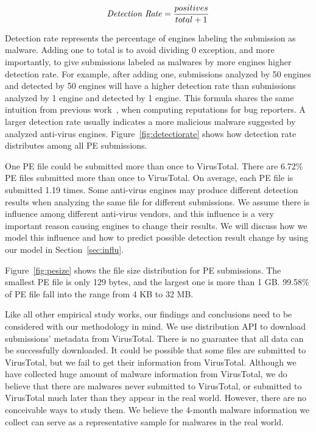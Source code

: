 $$ \textrm{\textit{Detection Rate}} = \dfrac{positives}{total + 1}$$

Detection rate represents the percentage of engines labeling the submission as malware. 
Adding one to total is to avoid dividing 0 exception, and more importantly, 
to give submissions labeled as malwares by more engines higher detection rate. 
For example, after adding one, submissions analyzed by 50 engines and detected by 50 engines will have a higher detection rate 
than submissions analyzed by 1 engine and detected by 1 engine. 
This formula shares the same intuition from previous work~\cite{GuoICSE2010}, when computing reputations for bug reporters. 
A larger detection rate usually indicates a more malicious malware suggested by analyzed anti-virus engines. 
Figure~\ref{fig:detectiorate} shows how detection rate distributes among all PE submissions. 


One PE file could be submitted more than once to VirusTotal. 
There are 6.72\% PE files submitted more than once to VirusTotal. 
On average, each PE file is submitted 1.19 times. 
Some anti-virus engines may produce different detection results when analyzing the same file for different submissions.
We assume there is influence among different anti-virus vendors, 
and this influence is a very important reason causing engines to change their results.
We will discuss how we model this influence and how to predict possible detection result change by using our model in Section~\ref{sec:influ}.



Figure~\ref{fig:pesize} shows the file size distribution for PE submissions. 
The smallest PE file is only 129 bytes, and the largest one is more than 1 GB. 
99.58\% of PE file fall into the range from 4 KB to 32 MB. 

Like all other empirical study works, 
our findings and conclusions need to be considered with our methodology in mind. 
We use distribution API to download submissions' metadata from VirusTotal. 
There is no guarantee that all data can be successfully downloaded. 
It could be possible that some files are submitted to VirusTotal, 
but we fail to get their information from VirusTotal.
Although we have collected huge amount of malware information from VirusTotal,
we do believe that there are malwares never submitted to VirusTotal, 
or submitted to VirusTotal much later than they appear in the real world. 
However, there are no conceivable ways to study them.
We believe the 4-month malware information we collect can serve as a representative sample for malwares in the real world. 
